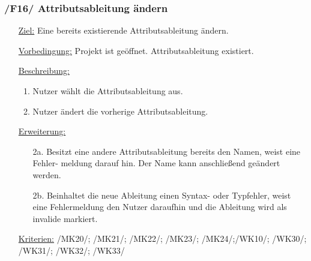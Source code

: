 \documentclass{article}
\begin{document}
\subsubsection*{\textbf{/F16/} Attributsableitung ändern} \label{sec:f:Attributsableitung ändern}
\begin{itemize}
    \item[\underline{Ziel:}] Eine bereits existierende Attributsableitung ändern.
    \item[\underline{Vorbedingung:}] Projekt ist geöffnet. Attributsableitung existiert.
    \item[\underline{Beschreibung:}]
    \begin{enumerate}
        \item Nutzer wählt die Attributsableitung aus.
        \item Nutzer ändert die vorherige Attributsableitung.
    \end{enumerate}
    \item[\underline{Erweiterung:}]
    \begin{itemize}
        \item[2a.] Besitzt eine andere Attributsableitung bereits den Namen, weist eine Fehler-
        meldung darauf hin. Der Name kann anschließend geändert werden.
        \item[2b.] Beinhaltet die neue Ableitung einen Syntax- oder Typfehler, weist eine Fehlermeldung den Nutzer daraufhin und die Ableitung wird als invalide markiert. 
    \end{itemize}
    \item[\underline{Kriterien:}] /MK20/; /MK21/; /MK22/; /MK23/; /MK24/;\newline/WK10/; /WK30/; /WK31/; /WK32/; /WK33/
\end{itemize}
\end{document}

